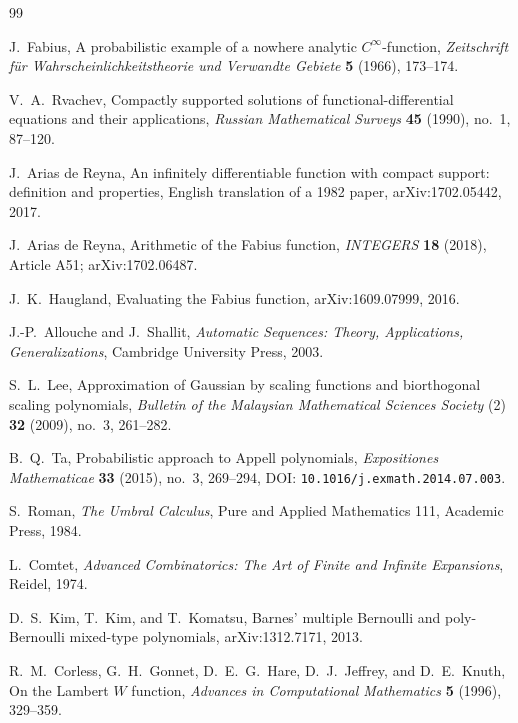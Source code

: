 \documentclass[11pt,oneside]{article}
\theoremstyle{frontier}
\theoremstyle{definition}
\theoremstyle{remark}
\begin{document}
\begin{thebibliography}{99}

J.~Fabius,
\newblock A probabilistic example of a nowhere analytic $C^\infty$-function,
\newblock \emph{Zeitschrift f\"ur Wahrscheinlichkeitstheorie und Verwandte Gebiete}
\textbf{5} (1966), 173--174.

V.~A.~Rvachev,
\newblock Compactly supported solutions of functional-differential equations and their applications,
\newblock \emph{Russian Mathematical Surveys} \textbf{45} (1990), no.~1, 87--120.

J.~Arias de Reyna,
\newblock An infinitely differentiable function with compact support: definition and properties,
\newblock English translation of a 1982 paper, arXiv:1702.05442, 2017.

J.~Arias de Reyna,
\newblock Arithmetic of the Fabius function,
\newblock \emph{INTEGERS} \textbf{18} (2018), Article A51; arXiv:1702.06487.

J.~K.~Haugland,
\newblock Evaluating the Fabius function,
\newblock arXiv:1609.07999, 2016.

J.-P.~Allouche and J.~Shallit,
\newblock \emph{Automatic Sequences: Theory, Applications, Generalizations},
\newblock Cambridge University Press, 2003.

S.~L.~Lee,
\newblock Approximation of Gaussian by scaling functions and biorthogonal scaling polynomials,
\newblock \emph{Bulletin of the Malaysian Mathematical Sciences Society} (2)
\textbf{32} (2009), no.~3, 261--282.

B.~Q.~Ta,
\newblock Probabilistic approach to Appell polynomials,
\newblock \emph{Expositiones Mathematicae} \textbf{33} (2015), no.~3, 269--294,
DOI: \nolinkurl{10.1016/j.exmath.2014.07.003}.

S.~Roman,
\newblock \emph{The Umbral Calculus},
\newblock Pure and Applied Mathematics 111, Academic Press, 1984.

L.~Comtet,
\newblock \emph{Advanced Combinatorics: The Art of Finite and Infinite Expansions},
\newblock Reidel, 1974.

D.~S.~Kim, T.~Kim, and T.~Komatsu,
\newblock Barnes' multiple Bernoulli and poly-Bernoulli mixed-type polynomials,
\newblock arXiv:1312.7171, 2013.

R.~M.~Corless, G.~H.~Gonnet, D.~E.~G.~Hare, D.~J.~Jeffrey, and D.~E.~Knuth,
\newblock On the Lambert $W$ function,
\newblock \emph{Advances in Computational Mathematics} \textbf{5} (1996), 329--359.


\end{thebibliography}
\end{document}
